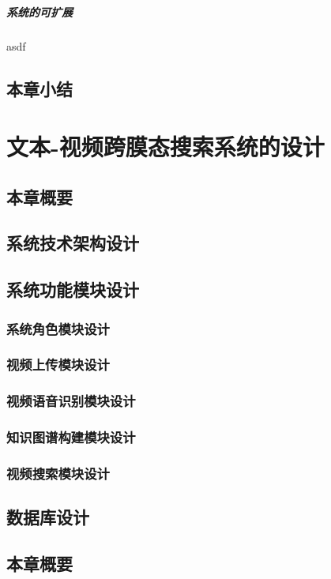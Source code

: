 \documentclass[12pt,a4paper,fancyhdr,openany,oneside]{ctexbook}
\begin{document}
\paragraph{系统的可扩展}asdf
\section{本章小结}
% 
\chapter{文本-视频跨膜态搜索系统的设计}
\section{本章概要}
\section{系统技术架构设计}
\section{系统功能模块设计}
\subsection{系统角色模块设计}
\subsection{视频上传模块设计}
\subsection{视频语音识别模块设计}
\subsection{知识图谱构建模块设计}
\subsection{视频搜索模块设计}
\section{数据库设计}
\section{本章概要}
\end{document}
